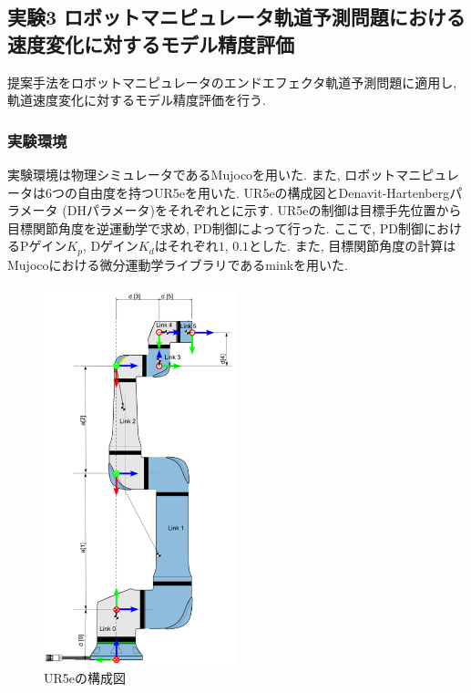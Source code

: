 \subsection{実験3 ロボットマニピュレータ軌道予測問題における速度変化に対するモデル精度評価}
提案手法をロボットマニピュレータのエンドエフェクタ軌道予測問題に適用し, 軌道速度変化に対するモデル精度評価を行う.

\subsubsection{実験環境}
実験環境は物理シミュレータであるMujoco\cite{mujoco}を用いた.
また, ロボットマニピュレータは6つの自由度を持つUR5eを用いた.
UR5eの構成図とDenavit-Hartenbergパラメータ (DHパラメータ)をそれぞれとに示す.
UR5eの制御は目標手先位置から目標関節角度を逆運動学で求め, PD制御によって行った.
ここで, PD制御におけるPゲイン$K_p$, Dゲイン$K_d$はそれぞれ$1$, $0.1$とした.
また, 目標関節角度の計算はMujocoにおける微分運動学ライブラリであるmink\cite{mink}を用いた.
\begin{figure}[htb]
    \centering
    \includegraphics[width=0.5\textwidth]{Static/ur5e_structure.png}
    \caption{UR5eの構成図 \cite{ur5e}}
    \label{fig:ur5e:structure}
\end{figure}

